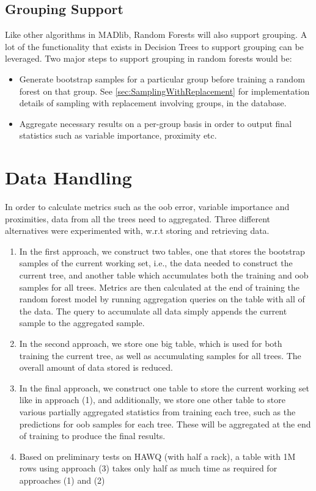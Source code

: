 \subsection{Grouping Support}
Like other algorithms in MADlib, Random Forests will also support grouping. A lot of the 
functionality that exists in Decision Trees to support grouping can be leveraged. 
Two major steps to support grouping in random forests would be:
\begin{itemize}
    \item Generate bootstrap samples for a particular group before training a random forest 
    on that group. See \ref{sec:SamplingWithReplacement} for implementation details of 
    sampling with replacement involving groups, in the database. 
    \item Aggregate necessary results on a per-group basis in order to output final statistics
    such as variable importance, proximity etc.
\end{itemize}

\section{Data Handling}
\label{sec:dataHandling}

In order to calculate metrics such as the oob error, variable importance and proximities, 
data from all the trees need to aggregated. Three different alternatives were 
experimented with, w.r.t storing and retrieving data.  

\begin{enumerate}
    \item In the first approach, we construct two tables, one that stores the bootstrap samples
    of the current working set, i.e., the data needed to construct the current tree, 
    and another table which accumulates both the training and oob samples for all trees.
    Metrics are then calculated at the end of training the random forest model by running
    aggregation queries on the table with all of the data. The query to accumulate all data 
    simply appends the current sample to the aggregated sample. 
    \item In the second approach, we store one big table, which is used for both training the 
    current tree, as well as accumulating samples for all trees. The overall amount of data 
    stored is reduced. 
    \item In the final approach, we construct one table to store the current working set like in
    approach (1), and additionally, we store one other table to store various partially 
    aggregated statistics from training each tree, such as the predictions for oob samples 
    for each tree. These will be aggregated at the end of training to produce the final results.   
    \item Based on preliminary tests on HAWQ (with half a rack), a table with 1M rows 
    using approach (3) takes only half as much time as required for approaches (1) and (2)
\end{enumerate}

